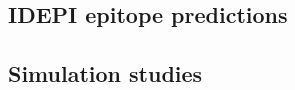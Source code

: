 \documentclass[10pt]{article}
\newcommand{\hmic}{{IC}$_{50}$}
\newcommand{\idepi}{{IDEPI}}
\newcommand{\N}{\emph{N}}
\begin{document}
\subsection*{\idepi{} epitope predictions}

%
%
%



\subsection*{Simulation studies}
\end{document}
